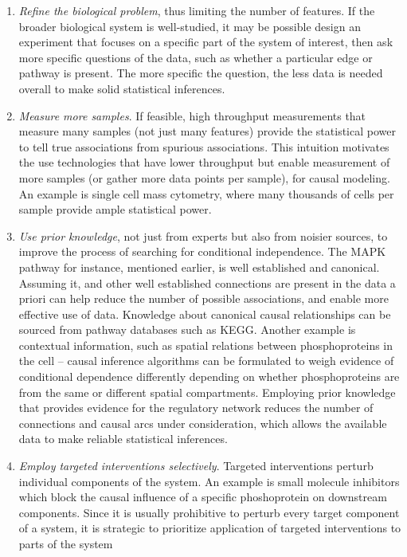 \documentclass[journal=jacsat,manuscript=article]{achemso}
\begin{document}
\begin{enumerate}
\item \textit{Refine the biological problem}, thus limiting the number of features. If
the broader biological system is well-studied, it may be possible design
an experiment that focuses on a specific part of the system of interest,
then ask more specific questions of the data, such as whether a
particular edge or pathway is present. The more specific the question,
the less data is needed overall to make solid statistical inferences.
\item \textit{Measure more samples}. If feasible, high throughput measurements that
measure many samples (not just many features) provide the statistical
power to tell true associations from spurious associations. This
intuition motivates the use technologies that have lower throughput but
enable measurement of more samples (or gather more data points per
sample), for causal modeling. An example is single cell mass cytometry,
where many thousands of cells per sample provide ample statistical
power.
\item \textit{Use prior knowledge}, not just from experts but also from noisier
sources, to improve the process of searching for conditional
independence. The MAPK pathway for instance, mentioned earlier, is well
established and canonical. Assuming it, and other well established
connections are present in the data a priori can help reduce the number of possible
associations, and enable more effective use of data. Knowledge about
canonical causal relationships can be sourced from pathway databases
such as KEGG. Another example is contextual information, such as spatial
relations between phosphoproteins in the cell -- causal inference
algorithms can be formulated to weigh evidence of conditional dependence
differently depending on whether phosphoproteins are from the same or
different spatial compartments. Employing prior knowledge that provides
evidence for the regulatory network reduces the number of connections
and causal arcs under consideration, which allows the available data to
make reliable statistical inferences.
\item \textit{Employ targeted interventions selectively}. Targeted interventions
perturb individual components of the system. An example is small
molecule inhibitors which block the causal influence of a specific
phoshoprotein on downstream components. Since it is usually prohibitive
to perturb every target component of a system, it is strategic to
prioritize application of targeted interventions to parts of the system

\end{enumerate}
\end{document}
